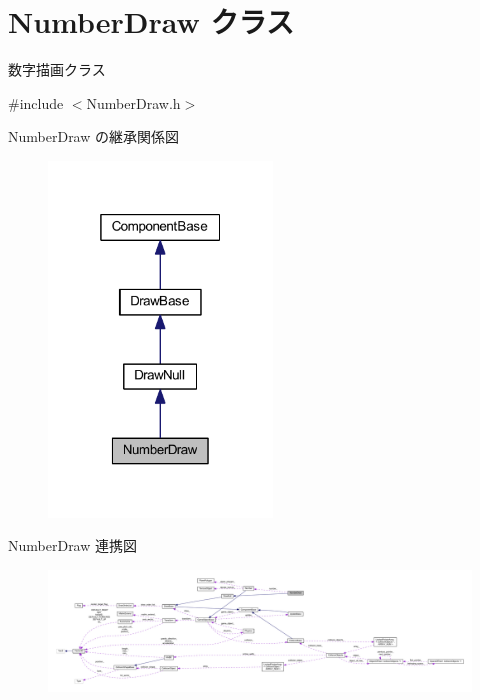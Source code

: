 \hypertarget{class_number_draw}{}\section{Number\+Draw クラス}
\label{class_number_draw}


数字描画クラス  




{\ttfamily \#include $<$Number\+Draw.\+h$>$}



Number\+Draw の継承関係図\nopagebreak
\begin{figure}[H]
\begin{center}
\leavevmode
\includegraphics[width=169pt]{class_number_draw__inherit__graph}
\end{center}
\end{figure}


Number\+Draw 連携図\nopagebreak
\begin{figure}[H]
\begin{center}
\leavevmode
\includegraphics[width=350pt]{class_number_draw__coll__graph}
\end{center}
\end{figure}
